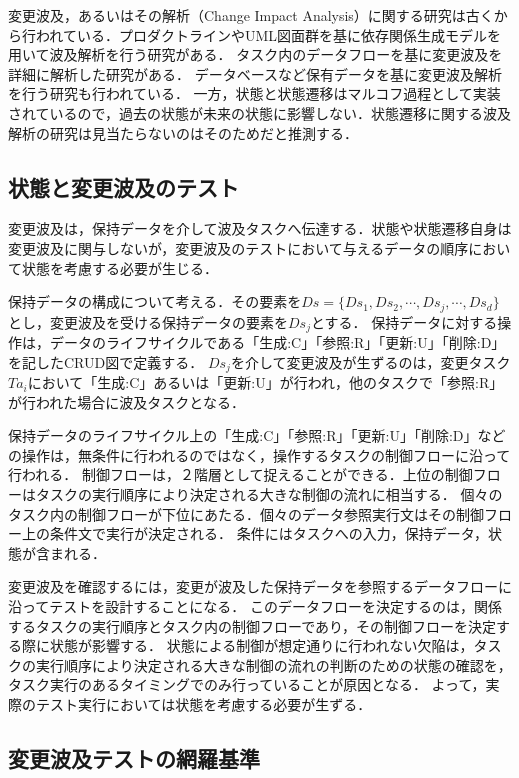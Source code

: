 \documentclass[a4paper,12pt]{jreport}
\begin{document}
変更波及，あるいはその解析（Change Impact Analysis）に関する研究は古くから行われている．プロダクトラインやUML図面群を基に依存関係生成モデルを用いて波及解析を行う研究がある\cite{gomaa2005designing,briand2003impact,小谷正行2008}．
タスク内のデータフローを基に変更波及を詳細に解析した研究がある\cite{campbell1990}．
データベースなど保有データを基に変更波及解析を行う研究も行われている\cite{maule2008impact,加藤正恭2011}．
一方，状態と状態遷移はマルコフ過程として実装されているので，過去の状態が未来の状態に影響しない．状態遷移に関する波及解析の研究は見当たらないのはそのためだと推測する．%

\subsection{状態と変更波及のテスト}
変更波及は，保持データを介して波及タスクへ伝達する．状態や状態遷移自身は変更波及に関与しないが，変更波及のテストにおいて与えるデータの順序において状態を考慮する必要が生じる．

保持データの構成について考える．その要素を$Ds=\{Ds_1,Ds_2,\cdots,Ds_j,\cdots,Ds_d\}$とし，変更波及を受ける保持データの要素を$Ds_j$とする．
保持データに対する操作は，データのライフサイクルである「生成:C」「参照:R」「更新:U」「削除:D」を記したCRUD図で定義する．
$Ds_j$を介して変更波及が生ずるのは，変更タスク$Ta_i$において「生成:C」あるいは「更新:U」が行われ，他のタスクで「参照:R」が行われた場合に波及タスクとなる．

保持データのライフサイクル上の「生成:C」「参照:R」「更新:U」「削除:D」などの操作は，無条件に行われるのではなく，操作するタスクの制御フローに沿って行われる．
制御フローは，２階層として捉えることができる．上位の制御フローはタスクの実行順序により決定される大きな制御の流れに相当する．
個々のタスク内の制御フローが下位にあたる．個々のデータ参照実行文はその制御フロー上の条件文で実行が決定される．
条件にはタスクへの入力，保持データ，状態が含まれる．

変更波及を確認するには，変更が波及した保持データを参照するデータフローに沿ってテストを設計することになる．
このデータフローを決定するのは，関係するタスクの実行順序とタスク内の制御フローであり，その制御フローを決定する際に状態が影響する．
状態による制御が想定通りに行われない欠陥は，タスクの実行順序により決定される大きな制御の流れの判断のための状態の確認を，タスク実行のあるタイミングでのみ行っていることが原因となる．%
よって，実際のテスト実行においては状態を考慮する必要が生ずる．

\subsection{変更波及テストの網羅基準}
\end{document}
